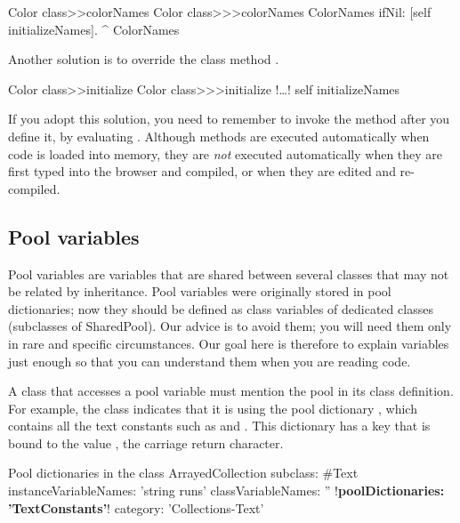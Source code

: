 \documentclass[a4paper,10pt,twoside]{book}
\begin{document}
\begin{method}[colorclasscolornames]{Color class>>colorNames}
Color class>>>colorNames	
	ColorNames ifNil: [self initializeNames].
	^ ColorNames
\end{method}	

Another solution is to override the class method .

\begin{method}[colorclassinit]{Color class>>initialize}
Color class>>>initialize	
	!\ldots!
	self initializeNames
\end{method}	

\noindent
If you adopt this solution, you need to remember to invoke the  method after you define it, \eg by evaluating .
Although   methods are executed automatically when code is loaded into memory, they are \emph{not} executed automatically when they are first typed into the browser and compiled, or when they are edited and re-compiled.

\subsection{Pool variables}
Pool variables are variables that are shared between several classes that may not be related by inheritance.
Pool variables were originally stored in pool dictionaries; now they should be defined as class variables of dedicated classes (subclasses of SharedPool). Our advice is to avoid them; you will need them only in rare and specific circumstances.
Our goal here is therefore to explain  variables just enough so that you can understand them when you are reading code. 

A class that accesses a pool variable must mention the pool in its class definition. 
For example, the class  
indicates that it is using the pool dictionary , which contains all the text constants such as  and . 
This dictionary has a key  that is bound to the value , \ie the carriage return character.

\begin{classdef}[textpooldict]{Pool dictionaries in the  class}
ArrayedCollection subclass: #Text
        instanceVariableNames: 'string runs' 	
        classVariableNames: '' 	
        !\textbf{poolDictionaries: 'TextConstants'}!
        category: 'Collections-Text'
\end{classdef}
   
\end{document}
